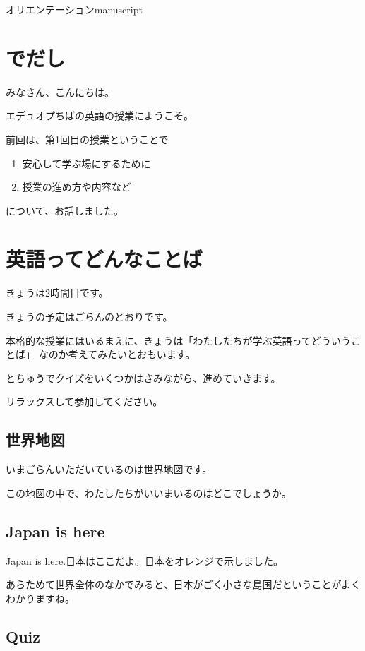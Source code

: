 \documentclass[12pt]{jlreq}
\begin{document}

\begin{center}\Large
 オリエンテーションmanuscript
\end{center}

\bigskip


\section{でだし}
みなさん、こんにちは。

エデュオプちばの英語の授業にようこそ。

前回は、第1回目の授業ということで
\begin{enumerate}
 \item 安心して学ぶ場にするために
 \item 授業の進め方や内容など
\end{enumerate}
について、お話しました。


\section{英語ってどんなことば}

きょうは2時間目です。

きょうの予定はごらんのとおりです。

本格的な授業にはいるまえに、きょうは「わたしたちが学ぶ英語ってどういうことば」
なのか考えてみたいとおもいます。

とちゅうでクイズをいくつかはさみながら、進めていきます。

リラックスして参加してください。

\subsection{世界地図}
いまごらんいただいているのは世界地図です。

この地図の中で、わたしたちがいいまいるのはどこでしょうか。

\subsection{Japan is here}

Japan is here.日本はここだよ。日本をオレンジで示しました。

あらためて世界全体のなかでみると、日本がごく小さな島国だということがよくわかりますね。

\subsection{Quiz}
\end{document}
